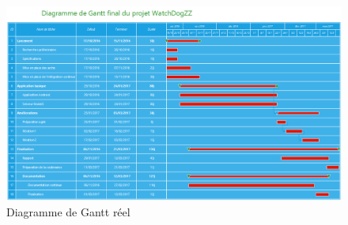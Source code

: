 \begin{landscape}
    \begin{figure}[h]
        \centering
        \includegraphics[height=\textwidth]{../gantt_final.png}
        \caption{Diagramme de Gantt réel}
        \label{ganttfinal}
    \end{figure}
\end{landscape}
